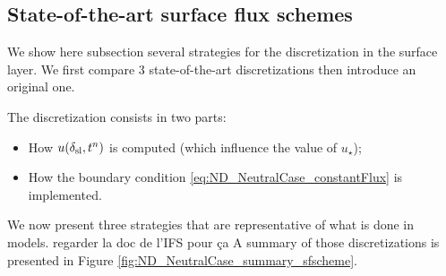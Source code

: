 \subsection{State-of-the-art surface flux schemes}
We show here subsection several strategies for the
discretization in the surface layer. We first compare 3
state-of-the-art discretizations then introduce an original one.

The discretization consists in two parts:
\begin{itemize}
	\item How $u(\delta_{\rm sl}, t^n)$ is computed
		(which influence the value of $u_\star$);
	\item How the boundary condition 
		\eqref{eq:ND_NeutralCase_constantFlux} is implemented.
\end{itemize}
  We now present three strategies that are representative of
  what is done in models.
  {\color{red} regarder la doc de l'IFS pour ça}
  A summary of those discretizations
  is presented in Figure \ref{fig:ND_NeutralCase_summary_sfscheme}.
